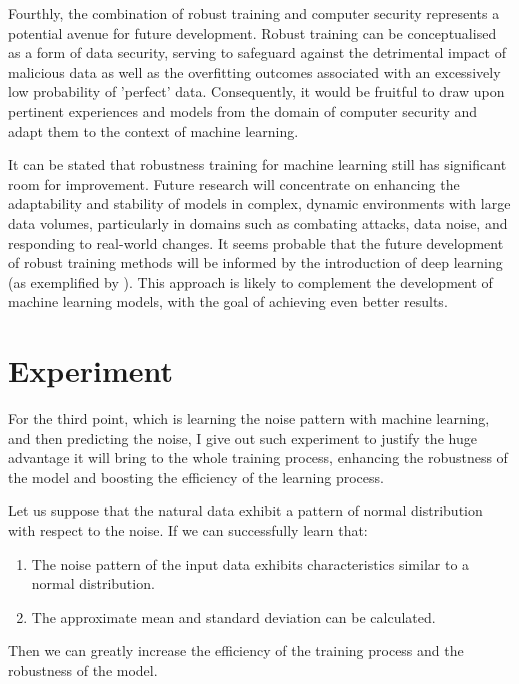 \documentclass{article}
\begin{document}
Fourthly, the combination of robust training and computer security represents a potential avenue for future development. Robust training can be conceptualised as a form of data security, serving to safeguard against the detrimental impact of malicious data as well as the overfitting outcomes associated with an excessively low probability of 'perfect' data. Consequently, it would be fruitful to draw upon pertinent experiences and models from the domain of computer security and adapt them to the context of machine learning.

It can be stated that robustness training for machine learning still has significant room for improvement. Future research will concentrate on enhancing the adaptability and stability of models in complex, dynamic environments with large data volumes, particularly in domains such as combating attacks, data noise, and responding to real-world changes. It seems probable that the future development of robust training methods will be informed by the introduction of deep learning (as exemplified by  \cite{akhmedova2024ganeticlossgenerativeadversarial}). This approach is likely to complement the development of machine learning models, with the goal of achieving even better results.


\section{Experiment}

For the third point, which is learning the noise pattern with machine learning, and then predicting the noise, I give out such experiment to justify the huge advantage it will bring to the whole training process, enhancing the robustness of the model and boosting the efficiency of the learning process.

Let us suppose that the natural data exhibit a pattern of normal distribution with respect to the noise. If we can successfully learn that:

\begin{enumerate}
    \item The noise pattern of the input data exhibits characteristics similar to a normal distribution.
    \item The approximate mean and standard deviation can be calculated.
\end{enumerate}

Then we can greatly increase the efficiency of the training process and the robustness of the model.
\end{document}
